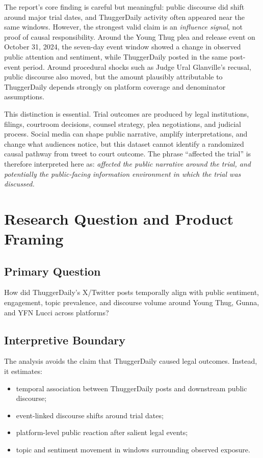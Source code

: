 \documentclass[12pt]{article}
\begin{document}
The report's core finding is careful but meaningful: public discourse did shift around major trial dates, and ThuggerDaily activity often appeared near the same windows. However, the strongest valid claim is an \emph{influence signal}, not proof of causal responsibility. Around the Young Thug plea and release event on October 31, 2024, the seven-day event window showed a change in observed public attention and sentiment, while ThuggerDaily posted in the same post-event period. Around procedural shocks such as Judge Ural Glanville's recusal, public discourse also moved, but the amount plausibly attributable to ThuggerDaily depends strongly on platform coverage and denominator assumptions.

This distinction is essential. Trial outcomes are produced by legal institutions, filings, courtroom decisions, counsel strategy, plea negotiations, and judicial process. Social media can shape public narrative, amplify interpretations, and change what audiences notice, but this dataset cannot identify a randomized causal pathway from tweet to court outcome. The phrase ``affected the trial'' is therefore interpreted here as: \emph{affected the public narrative around the trial, and potentially the public-facing information environment in which the trial was discussed.}

\section{Research Question and Product Framing}
\subsection{Primary Question}
How did ThuggerDaily's X/Twitter posts temporally align with public sentiment, engagement, topic prevalence, and discourse volume around Young Thug, Gunna, and YFN Lucci across platforms?

\subsection{Interpretive Boundary}
The analysis avoids the claim that ThuggerDaily caused legal outcomes. Instead, it estimates:
\begin{itemize}[leftmargin=*]
\item temporal association between ThuggerDaily posts and downstream public discourse;
\item event-linked discourse shifts around trial dates;
\item platform-level public reaction after salient legal events;
\item topic and sentiment movement in windows surrounding observed exposure.
\end{itemize}
\end{document}
